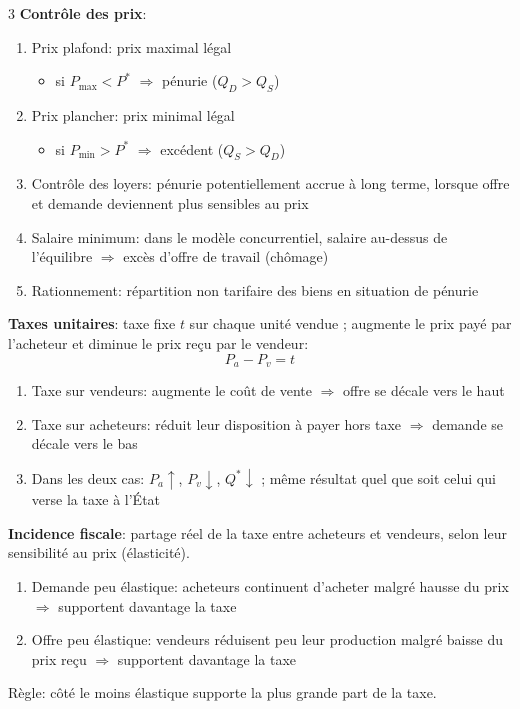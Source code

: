 \documentclass[12pt, a4paper]{article}
\begin{document}
\begin{multicols*}{3}
\textbf{Contrôle des prix}:
\begin{enumerate}[\roman*.]
  \item Prix plafond: prix maximal légal
    \begin{itemize}[topsep=0.5em]
      \item si $P_{\max}<P^*$ $\Rightarrow$ pénurie ($Q_D>Q_S$) 
    \end{itemize}
  \item Prix plancher: prix minimal légal
    \begin{itemize}[topsep=.5em]
      \item si $P_{\min}>P^*$ $\Rightarrow$ excédent ($Q_S>Q_D$)
    \end{itemize}
  \item Contrôle des loyers: pénurie potentiellement accrue à long terme, lorsque offre et demande deviennent plus sensibles au prix
  \item Salaire minimum: dans le modèle concurrentiel, salaire au-dessus de l'équilibre $\Rightarrow$ excès d'offre de travail (chômage)
  \item Rationnement: répartition non tarifaire des biens en situation de pénurie
\end{enumerate}

\textbf{Taxes unitaires}: taxe fixe $t$ sur chaque unité vendue ; augmente le prix payé par l'acheteur et diminue le prix reçu par le vendeur:
\[
\boxed{P_a-P_v=t}
\]
\begin{enumerate}[\roman*.]
  \item Taxe sur vendeurs: augmente le coût de vente $\Rightarrow$ offre se décale vers le haut
  \item Taxe sur acheteurs: réduit leur disposition à payer hors taxe $\Rightarrow$ demande se décale vers le bas
  \item Dans les deux cas: $P_a\uparrow$, $P_v\downarrow$, $Q^*\downarrow$ ; même résultat quel que soit celui qui verse la taxe à l'État
\end{enumerate}

\textbf{Incidence fiscale}: partage réel de la taxe entre acheteurs et vendeurs, selon leur sensibilité au prix (élasticité).
\begin{enumerate}[\roman*.]
  \item Demande peu élastique: acheteurs continuent d'acheter malgré hausse du prix $\Rightarrow$ supportent davantage la taxe
  \item Offre peu élastique: vendeurs réduisent peu leur production malgré baisse du prix reçu $\Rightarrow$ supportent davantage la taxe
\end{enumerate}
Règle: côté le moins élastique supporte la plus grande part de la taxe.


\end{multicols*}
\end{document}
